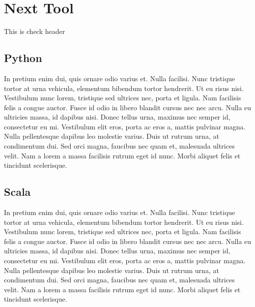 \documentclass{report}
\begin{document}
    \begingroup
    \let\clearpage\relax
    \chapter{Next Tool}
    \endgroup

    \thispagestyle{fancy} %

    This is check header
    \section{Python}
	In pretium enim dui, quis ornare odio varius et. Nulla facilisi. Nunc tristique tortor at urna vehicula, elementum bibendum tortor hendrerit. Ut eu risus nisi. Vestibulum nunc lorem, tristique sed ultrices nec, porta et ligula. Nam facilisis felis a congue auctor. Fusce id odio in libero blandit cursus nec nec arcu. Nulla eu ultricies massa, id dapibus nisi. Donec tellus urna, maximus nec semper id, consectetur eu mi. Vestibulum elit eros, porta ac eros a, mattis pulvinar magna. Nulla pellentesque dapibus leo molestie varius. Duis ut rutrum urna, at condimentum dui. Sed orci magna, faucibus nec quam et, malesuada ultrices velit. Nam a lorem a massa facilisis rutrum eget id nunc. Morbi aliquet felis et tincidunt scelerisque.

    \section{Scala}
	In pretium enim dui, quis ornare odio varius et. Nulla facilisi. Nunc tristique tortor at urna vehicula, elementum bibendum tortor hendrerit. Ut eu risus nisi. Vestibulum nunc lorem, tristique sed ultrices nec, porta et ligula. Nam facilisis felis a congue auctor. Fusce id odio in libero blandit cursus nec nec arcu. Nulla eu ultricies massa, id dapibus nisi. Donec tellus urna, maximus nec semper id, consectetur eu mi. Vestibulum elit eros, porta ac eros a, mattis pulvinar magna. Nulla pellentesque dapibus leo molestie varius. Duis ut rutrum urna, at condimentum dui. Sed orci magna, faucibus nec quam et, malesuada ultrices velit. Nam a lorem a massa facilisis rutrum eget id nunc. Morbi aliquet felis et tincidunt scelerisque.
\end{document}

